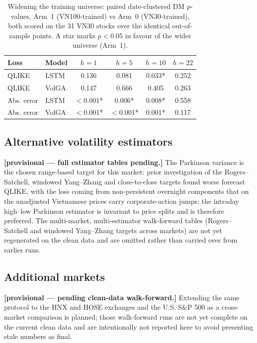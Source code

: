 \documentclass[runningheads]{llncs}
\begin{document}
\begin{table}[h]\centering
\caption{Widening the training universe: paired date-clustered DM $p$-values, Arm~1 (VN100-trained)
vs Arm~0 (VN30-trained), both scored on the 31 VN30 stocks over the identical out-of-sample points.
A star marks $p<0.05$ in favour of the wider universe (Arm~1).}\label{tab:pool}
\begin{tabular}{llcccc}
\toprule
Loss & Model & $h{=}1$ & $h{=}5$ & $h{=}10$ & $h{=}22$ \\
\midrule
QLIKE & LSTM & 0.136 & 0.081 & 0.033* & 0.252 \\
QLIKE & VolGA & 0.147 & 0.666 & 0.405 & 0.263 \\
Abs. error & LSTM & $<$0.001* & 0.006* & 0.008* & 0.558 \\
Abs. error & VolGA & $<$0.001* & $<$0.001* & 0.001* & 0.117 \\
\bottomrule
\end{tabular}
\end{table}

\subsection{Alternative volatility estimators}\label{sec:est}
\textbf{[provisional --- full estimator tables pending.]} The Parkinson variance is the chosen
range-based target for this market: prior investigation of the Rogers--Satchell, windowed
Yang--Zhang and close-to-close targets found worse forecast QLIKE, with the loss coming from
non-persistent overnight components that on the unadjusted Vietnamese prices carry corporate-action
jumps; the intraday high--low Parkinson estimator is invariant to price splits and is therefore
preferred. The multi-market, multi-estimator walk-forward tables (Rogers--Satchell and windowed
Yang--Zhang targets across markets) are not yet regenerated on the clean data and are omitted rather
than carried over from earlier runs.

\subsection{Additional markets}
\textbf{[provisional --- pending clean-data walk-forward.]} Extending the same protocol to the HNX and
HOSE exchanges and the U.S. S\&P 500 as a cross-market comparison is planned; those walk-forward runs
are not yet complete on the current clean data and are intentionally not reported here to avoid
presenting stale numbers as final.
\end{document}
